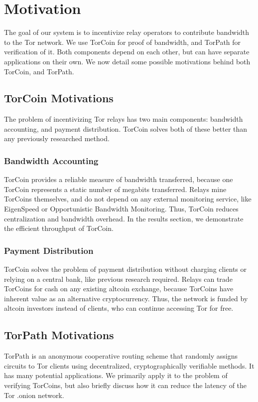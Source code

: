 \section{Motivation} \label{motivation}

The goal of our system is to incentivize relay operators to contribute bandwidth to the Tor network. We use TorCoin for proof of bandwidth, and TorPath for verification of it. Both components depend on each other, but can have separate applications on their own. We now detail some possible motivations behind both TorCoin, and TorPath.

\subsection{TorCoin Motivations}

The problem of incentivizing Tor relays has two main components: bandwidth accounting, and payment distribution. TorCoin solves both of these better than any previously researched method.

\subsubsection{Bandwidth Accounting}

TorCoin provides a reliable measure of bandwidth transferred, because one TorCoin represents a static number of megabits transferred. Relays mine TorCoins themselves, and do not depend on any external monitoring service, like EigenSpeed \cite{jansen2013lira} or Opportunistic Bandwidth Monitoring. \cite{snader2008tune} Thus, TorCoin reduces centralization and bandwidth overhead. In the results section, we demonstrate the efficient throughput of TorCoin.

\subsubsection{Payment Distribution}
TorCoin solves the problem of payment distribution without charging clients or relying on a central bank, like previous research required. \cite{jansen2013lira} Relays can trade TorCoins for cash on any existing altcoin exchange, because TorCoins have inherent value as an alternative cryptocurrency. Thus, the network is funded by altcoin investors instead of clients, who can continue accessing Tor for free.

\subsection{TorPath Motivations}
TorPath is an anonymous cooperative routing scheme that randomly assigns circuits to Tor clients using decentralized, cryptographically verifiable methods. It has many potential applications. We primarily apply it to the problem of verifying TorCoins, but also briefly discuss how it can reduce the latency of the Tor .onion network.

